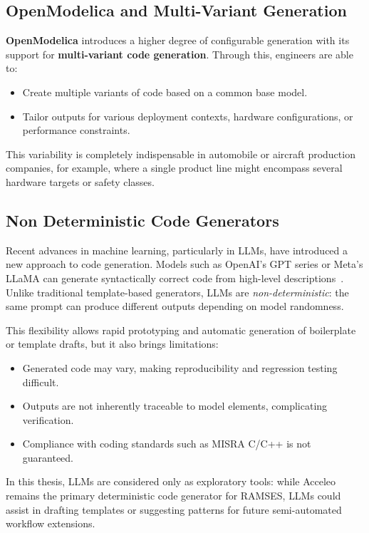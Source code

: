 \subsection{OpenModelica and Multi-Variant Generation}
\label{sec:open_model}

\textbf{OpenModelica} introduces a higher degree of configurable generation with its support for \textbf{multi-variant code generation}. Through this, engineers are able to:
\begin{itemize} 
	\item Create multiple variants of code based on a common base model.
	\item Tailor outputs for various deployment contexts, hardware configurations, or performance constraints.
\end{itemize}

This variability is completely indispensable in automobile or aircraft production companies, for example, where a single product line might encompass several hardware targets or safety classes.




\subsection{Non Deterministic Code Generators}
\label{sec:llms}

Recent advances in machine learning, particularly in \gls{LLMs}, have introduced a new approach to code generation. Models such as OpenAI's GPT series or Meta's LLaMA can generate syntactically correct code from high-level descriptions~\cite{li2023llmcodegen}. Unlike traditional template-based generators, \gls{LLMs} are \textit{non-deterministic}: the same prompt can produce different outputs depending on model randomness. 

This flexibility allows rapid prototyping and automatic generation of boilerplate or template drafts, but it also brings limitations:

\begin{itemize}
	\item Generated code may vary, making reproducibility and regression testing difficult.
	\item Outputs are not inherently traceable to model elements, complicating verification.
	\item Compliance with coding standards such as MISRA C/C++ is not guaranteed.
\end{itemize}

In this thesis, \gls{LLMs} are considered only as exploratory tools: while Acceleo remains the primary deterministic code generator for \gls{RAMSES}, \gls{LLMs} could assist in drafting templates or suggesting patterns for future semi-automated workflow extensions.

